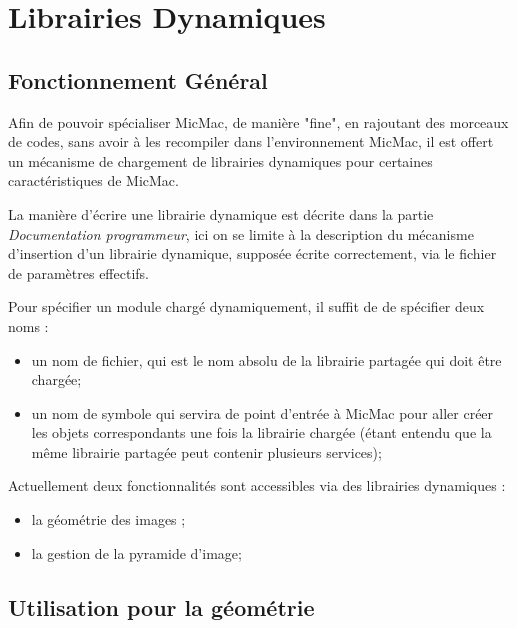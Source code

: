 
\section{Librairies Dynamiques}

\label{Lib:Dyn}

\subsection{Fonctionnement G\'en\'eral}

Afin de pouvoir sp\'ecialiser MicMac, de mani\`ere "fine",
en rajoutant des morceaux de codes, sans avoir \`a les recompiler
 dans l'environnement MicMac, il est offert un 
m\'ecanisme de chargement de librairies dynamiques pour certaines
caract\'eristiques de MicMac.

La mani\`ere d'\'ecrire une librairie dynamique est d\'ecrite dans
la partie \emph{Documentation programmeur}, ici on se limite \`a
la description du m\'ecanisme d'insertion d'un librairie dynamique,
suppos\'ee \'ecrite correctement, via le fichier de param\`etres effectifs.

Pour sp\'ecifier un module charg\'e dynamiquement, il suffit de
de sp\'ecifier deux noms :

\begin{itemize}
   \item un nom de fichier, qui est le nom absolu de la librairie
         partag\'ee qui doit \^etre charg\'ee;

   \item un nom de symbole qui servira de point d'entr\'ee \`a MicMac
         pour aller cr\'eer les objets correspondants une fois
         la librairie charg\'ee (\'etant entendu
         que la m\^eme librairie partag\'ee peut contenir plusieurs 
         services);
\end{itemize}

Actuellement deux fonctionnalit\'es sont accessibles via des librairies
dynamiques :

\begin{itemize}
   \item la g\'eom\'etrie des images ;
   \item la gestion de la pyramide d'image;
\end{itemize}


\subsection{Utilisation pour la g\'eom\'etrie}

